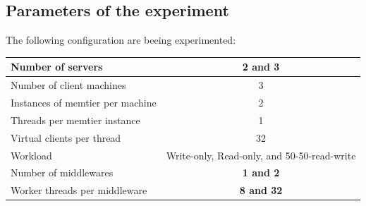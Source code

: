 \documentclass[11pt,a4paper]{article}
\begin{document}
\subsection{Parameters of the experiment}
The following configuration are beeing experimented:
\begin{center}
	\scriptsize{
		\begin{tabular}{|l|c|}
			\hline Number of servers                & \textbf{2 and 3}                                     \\ 
			\hline Number of client machines        & 3                                           \\ 
			\hline Instances of memtier per machine & 2                                           \\ 
			\hline Threads per memtier instance     & 1                                           \\
			\hline Virtual clients per thread       & 32                                     \\ 
			\hline Workload                         & Write-only, Read-only, and 50-50-read-write \\
			\hline Number of middlewares            & \textbf{1 and 2}                                     \\
			\hline Worker threads per middleware    & \textbf{8 and 32}                                    \\
			\hline 
		\end{tabular}
	} 
\end{center}
\end{document}
